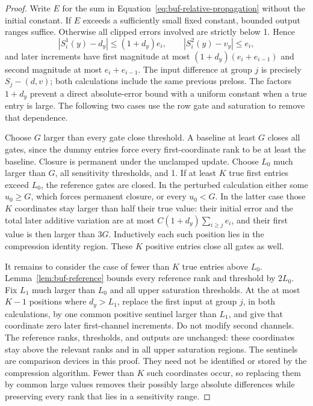\begin{proof}
Write $E$ for the sum in Equation~\eqref{eq:buf-relative-propagation}
without the initial constant.  If $E$ exceeds a sufficiently small fixed
constant, bounded output ranges suffice.  Otherwise all clipped errors
involved are strictly below 1.  Hence
\[
 |S_i^1(y)-d_y|\leq(1+d_y)e_i,
 \qquad |S_i^2(y)-v_y|\leq e_i,
\]
and later increments have first magnitude at most
$(1+d_y)(e_i+e_{i-1})$ and second magnitude at most $e_i+e_{i-1}$.
The input difference at group $j$ is precisely $S_j-(d,v)$; both
calculations include the same previous preloss.
The factors $1+d_y$ prevent a direct absolute-error bound with a uniform
constant when a true entry is large.  The following two cases use the
row gate and saturation to remove that dependence.

Choose $G$ larger than every gate close threshold.  A baseline at least
$G$ closes all gates, since the dummy entries force every first-coordinate
rank to be at least the baseline.  Closure is permanent under the
unclamped update.  Choose $L_0$ much larger than $G$, all sensitivity
thresholds, and 1.  If at least $K$ true first entries exceed $L_0$, the
reference gates are closed.  In the perturbed calculation either some
$u_0\geq G$, which forces permanent closure, or every $u_0<G$.
In the latter case those $K$ coordinates stay larger than half their
true value: their initial error and the total later additive variation
are at most $C(1+d_y)\sum_{i\geq j}e_i$, and their first value is then
larger than $3G$.  Inductively each such position lies in the compression
identity region.  These $K$ positive entries close all gates as well.

It remains to consider the case of fewer than $K$ true entries above
$L_0$.  Lemma~\ref{lem:buf-reference} bounds every reference rank and
threshold by $2L_0$.  Fix $L_1$ much larger than $L_0$ and all upper
saturation thresholds.  At the at most $K-1$ positions where $d_y>L_1$,
replace the first input at group $j$, in both calculations, by one common
positive sentinel larger than $L_1$, and give that coordinate zero later
first-channel increments.  Do not modify second channels.
The reference ranks, thresholds, and outputs are unchanged: these
coordinates stay above the relevant ranks and in all upper saturation
regions.
The sentinels are comparison devices in this proof.  They need not be
identified or stored by the compression algorithm.  Fewer than $K$ such
coordinates occur, so replacing them by common large values removes
their possibly large absolute differences while preserving every rank
that lies in a sensitivity range.


\end{proof}
